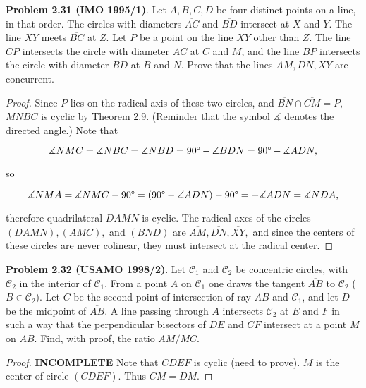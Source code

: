 \documentclass[letterpaper,oneside]{book}
\begin{document}
  

  \textbf{Problem 2.31 (IMO 1995/1)}.   Let  $A, B, C, D$ be four distinct points on a line, in that order. The circles with diameters $\overline{AC}$ and $\overline{BD}$ intersect at $X$ and $Y.$ The line $XY$ meets $\overline{BC}$ at $Z.$ Let $P$ be a point on the line $XY$ other than $Z$. The line $CP$ intersects the circle with diameter $AC$ at $C$ and $M$, and the line $BP$ intersects the circle with diameter $BD$ at $B$ and $N$. Prove that the lines $AM, DN, XY$ are concurrent.

  \begin{proof}  Since $P$ lies on the radical axis of these two circles, and $\overline{BN} \cap \overline{CM} =P,$ $MNBC$ is cyclic by Theorem 2.9. (Reminder that the symbol $\measuredangle$ denotes the directed angle.) Note that

$$\measuredangle NMC = \measuredangle NBC = \measuredangle NBD = 90\degree - \measuredangle BDN =  90\degree - \measuredangle ADN,$$

so 

$$\measuredangle NMA =   \measuredangle NMC -90\degree = (90\degree - \measuredangle ADN) - 90\degree = -\measuredangle ADN = \measuredangle NDA,$$

therefore quadrilateral $DAMN$ is cyclic. The radical axes of the circles $(DAMN), (AMC),$ and $(BND)$ are $\overline{AM}, \overline{DN}, \overline{XY},$ and since the centers of these circles are never colinear, they must intersect at the radical center. \end{proof}

  

  \textbf{Problem 2.32 (USAMO 1998/2)}.   Let $\mathcal{C}_1$ and $\mathcal{C}_2$ be concentric circles, with $\mathcal{C}_2$ in the interior of $\mathcal{C}_1$. From a point $A$ on $\mathcal{C}_1$ one draws the tangent $\overline{AB}$ to $\mathcal{C}_2$  ($B \in  \mathcal{C}_2$). Let $C$ be the second point of intersection of ray $AB$ and $\mathcal{C}_1$, and let $D$ be the midpoint of $\overline{AB}$. A line passing through $A$ intersects $\mathcal{C}_2$ at $E$ and $F$ in such a way that the perpendicular bisectors of $DE$ and $CF$ intersect at a point $M$ on $AB$. Find, with proof, the ratio $AM/MC$.
 
  \begin{proof}  \textbf{INCOMPLETE}
    Note that $CDEF$ is cyclic (need to prove). $M$ is the center of circle $(CDEF).$ Thus $CM=DM.$ \end{proof}
\end{document}
